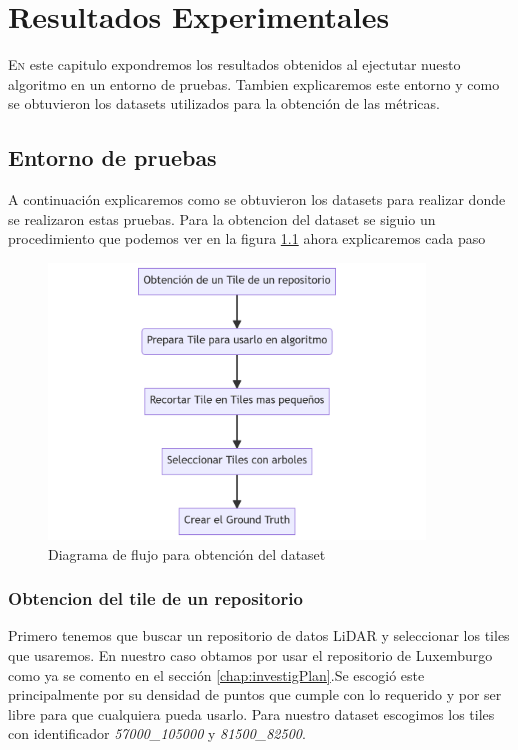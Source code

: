 \chapter{Resultados Experimentales}
\label{chap:Resultados}
\lettrine{E}{n} este capitulo expondremos los resultados obtenidos al ejectutar nuesto algoritmo en un entorno de pruebas. Tambien explicaremos este entorno y como se obtuvieron los datasets utilizados para la obtención de las métricas.

\section{Entorno de pruebas}
A continuación explicaremos como se obtuvieron los datasets para realizar donde se realizaron estas pruebas. 
Para la obtencion del dataset se siguio un procedimiento que podemos ver en la figura \ref{fig:flugdataset} ahora explicaremos cada paso

\begin{figure}[h]
\centering
    \includegraphics[width=10cm]{imaxes/mermaid-diagram-2023-09-02-195044.png}
    \caption{Diagrama de flujo para obtención del dataset}
    \label{fig:flugdataset}
\end{figure}

\subsection{Obtencion del tile de un repositorio}
Primero tenemos que buscar un repositorio de datos LiDAR y seleccionar los tiles que usaremos. En nuestro caso obtamos por usar el repositorio de Luxemburgo \cite{luxdata} como ya se comento en el sección \ref{chap:investigPlan}.Se escogió este principalmente por su densidad de puntos que cumple con lo requerido y por ser libre para que cualquiera pueda usarlo.
Para nuestro dataset escogimos los tiles con identificador \textit{57000\_105000} y \textit{81500\_82500}.

